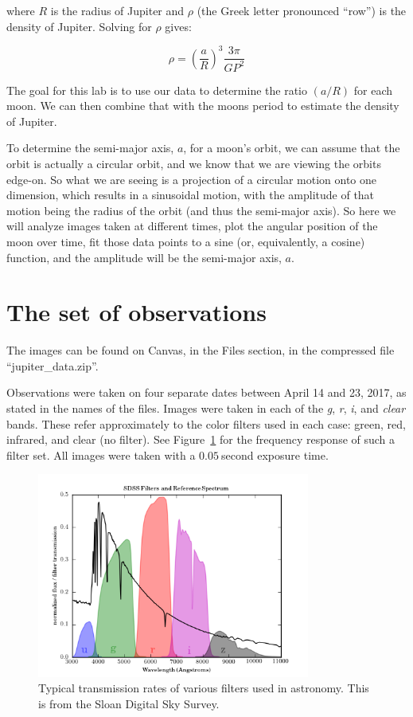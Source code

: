 where $R$ is the radius of Jupiter and $\rho$ (the Greek letter pronounced ``row'') is the density of Jupiter. Solving for $\rho$ gives:

\begin{equation}\label{jd:eqn:kepden}
\rho = \left(\frac{a}{R}\right)^3\frac{3\pi}{G P^2}
\end{equation}

The goal for this lab is to use our data to determine the ratio $(a/R)$ for each moon. We can then combine that with the moons period to estimate the density of Jupiter.

To determine the semi-major axis, $a$, for a moon's orbit, we can assume that the orbit is actually a circular orbit, and we know that we are viewing the orbits edge-on. So what we are seeing is a projection of a circular motion onto one dimension, which results in a sinusoidal motion, with the amplitude of that motion being the radius of the orbit (and thus the semi-major axis). So here we will analyze images taken at different times, plot the angular position of the moon over time, fit those data points to a sine (or, equivalently, a cosine) function, and the amplitude will be the semi-major axis, $a$.

\section{The set of observations}

The images can be found on Canvas, in the Files section, in the compressed file ``jupiter\_data.zip''.

Observations were taken on four separate dates between April 14 and 23, 2017, as stated in the names of the files. Images were taken in each of the \textit{g}, \textit{r}, \textit{i}, and \textit{clear} bands. These refer approximately to the color filters used in each case: green, red, infrared, and  clear (no filter). See Figure~\ref{jd:fig:filters} for the frequency response of such a filter set. All images were taken with a $0.05\:$second exposure time.

\begin{figure}
	\centering
	\includegraphics[width=0.8\textwidth]{jupiter-density/fig_sdss_filters_1}
	\caption{Typical transmission rates of various filters used in astronomy. This is from the Sloan Digital Sky Survey.}\label{jd:fig:filters}
\end{figure}


